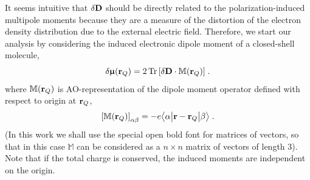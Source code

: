 \documentclass[aip,amsmath,amssymb,reprint,floatfix]{revtex4-1}
\newcommand{\tbraket}[3]{\ensuremath{\bigl\langle {#1} \bigl\lvert {#2} \bigl\lvert {#3} \bigr\rangle}}
\newcommand{\BM}[1]{\bm{#1}}
\DeclareMathOperator{\Tr}{Tr}
\begin{document}
It seems intuitive that $\delta {\bf D}$ should 
be directly related to the
polarization\hyp{}induced multipole moments because they are
a measure of the distortion of the electron density distribution due to the external electric
field. 
Therefore, 
we start our analysis by considering the induced electronic dipole moment 
of a closed-shell molecule, %
%
\begin{equation} \label{e:dmu-exact}
 \delta {\BM{\upmu}}({\bf r}_Q) = 
     2 \Tr{ 
         \left[ 
              \delta {\bf D} \cdot {\mathbb{M}({\bf r}_Q)}
         \right] } \;.
\end{equation}
%
where ${\mathbb{M}({\bf r}_Q)}$ is AO\hyp{}representation
of the dipole moment operator defined with respect to origin at ${\bf r}_Q$,
%
\begin{equation}\label{e:m}
 \left[ {\mathbb{M}({\bf r}_Q)} \right]_{\alpha\beta} = -e\tbraket{\alpha}{{\bf r} - {\bf r}_Q}{\beta} \;.
\end{equation}
%
(In this work we shall use the special open bold font for matrices of vectors, so that
in this case ${\mathbb{M}}$ can be considered as a $n \times n$ matrix of vectors of length 3).
Note that if the total charge is conserved, the induced moments are independent on the origin.
\end{document}
